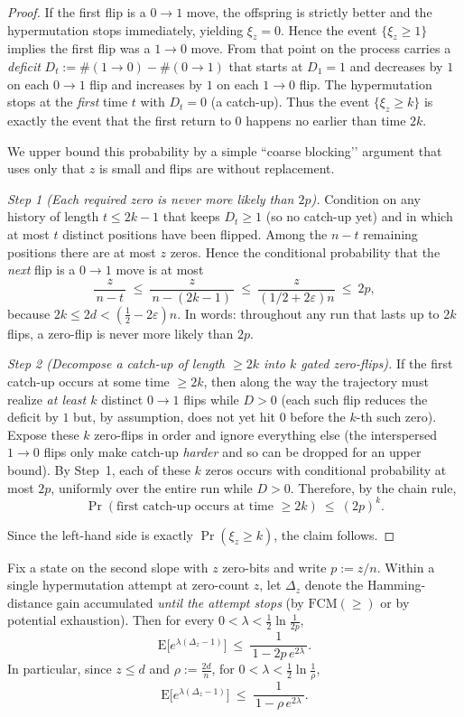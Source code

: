 \documentclass[lettersize,journal]{IEEEtran}
\newcommand{\EE}{\text{E}}
\begin{document}
\begin{proof}
	If the first flip is a $0\!\to 1$ move, the offspring is strictly better and the hypermutation stops immediately, yielding $\xi_z=0$. Hence the event $\{\xi_z\ge 1\}$ implies the first flip was a $1\!\to 0$ move. From that point on the process carries a \emph{deficit} $D_t:=\#(1\!\to 0)-\#(0\!\to 1)$ that starts at $D_1=1$ and decreases by $1$ on each $0\!\to 1$ flip and increases by $1$ on each $1\!\to 0$ flip. The hypermutation stops at the \emph{first} time $t$ with $D_t=0$ (a catch-up). Thus the event $\{\xi_z\ge k\}$ is exactly the event that the first return to $0$ happens no earlier than time $2k$.
	
	We upper bound this probability by a simple ``coarse blocking’’ argument that uses only that $z$ is small and flips are without replacement.
	
	\smallskip
	\emph{Step 1 (Each required zero is never more likely than $2p$).}
	Condition on any history of length $t\le 2k-1$ that keeps $D_t\ge 1$ (so no catch-up yet) and in which at most $t$ distinct positions have been flipped. Among the $n-t$ remaining positions there are at most $z$ zeros. Hence the conditional probability that the \emph{next} flip is a $0\!\to 1$ move is at most
	\[
	\frac{z}{\,n-t\,}\ \le\ \frac{z}{\,n-(2k-1)\,}\ \le\ \frac{z}{(1/2+2\varepsilon)n}\ \le\ 2p,
	\]
	because $2k\le 2d<(\tfrac12-2\varepsilon)n$. In words: throughout any run that lasts up to $2k$ flips, a zero-flip is never more likely than $2p$.
	
	\smallskip
	\emph{Step 2 (Decompose a catch-up of length $\ge 2k$ into $k$ gated zero-flips).}
	If the first catch-up occurs at some time $\ge 2k$, then along the way the trajectory must realize \emph{at least $k$} distinct $0\!\to 1$ flips while $D>0$ (each such flip reduces the deficit by $1$ but, by assumption, does not yet hit $0$ before the $k$-th such zero). Expose these $k$ zero-flips in order and ignore everything else (the interspersed $1\!\to 0$ flips only make catch-up \emph{harder} and so can be dropped for an upper bound). By Step~1, each of these $k$ zeros occurs with conditional probability at most $2p$, uniformly over the entire run while $D>0$. Therefore, by the chain rule,
	\[
	\Pr(\text{first catch-up occurs at time }\ge 2k)\ \le\ (2p)^k.
	\]
	
		
	Since the left-hand side is exactly $\Pr(\xi_z\ge k)$, the claim follows.
\end{proof}

\begin{lemma}\label{lem:attempt-mgf}
	Fix a state on the second slope with $z$ zero-bits and write $p:=z/n$.
	Within a single hypermutation attempt at zero-count $z$, let $\Delta_z$ denote the Hamming-distance gain accumulated \emph{until the attempt stops} (by $\mathrm{FCM}(\ge)$ or by potential exhaustion).
	Then for every $0<\lambda<\tfrac12\ln\!\frac{1}{2p}$,
	\[
	\EE\!\big[e^{\lambda(\Delta_z-1)}\big]\ \le\ \frac{1}{\,1-2p\,e^{2\lambda}\,}.
	\]
	In particular, since $z\le d$ and $\rho:=\tfrac{2d}{n}$, for $0<\lambda<\tfrac12\ln\!\tfrac{1}{\rho}$,
	\[
	\EE\!\big[e^{\lambda(\Delta_z-1)}\big]\ \le\ \frac{1}{\,1-\rho\,e^{2\lambda}\,}.
	\]
\end{lemma}
\end{document}
